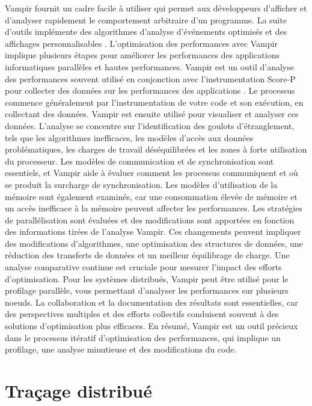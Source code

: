 Vampir fournit un cadre facile à utiliser qui permet aux développeurs d'afficher et d'analyser rapidement le comportement arbitraire d'un programme. La suite d'outils implémente des algorithmes d'analyse d'événements optimisés et des affichages personnalisables \cite{GmbH_Vampir}. L'optimisation des performances avec Vampir implique plusieurs étapes pour améliorer les performances des applications informatiques parallèles et hautes performances. Vampir est un outil d'analyse des performances souvent utilisé en conjonction avec l'instrumentation Score-P pour collecter des données sur les performances des applications \cite{Mix_2018}. Le processus commence généralement par l'instrumentation de votre code et son exécution, en collectant des données. Vampir est ensuite utilisé pour visualiser et analyser ces données. L'analyse se concentre sur l'identification des goulots d'étranglement, tels que les algorithmes inefficaces, les modèles d'accès aux données problématiques, les charges de travail déséquilibrées et les zones à forte utilisation du processeur. Les modèles de communication et de synchronisation sont essentiels, et Vampir aide à évaluer comment les processus communiquent et où se produit la surcharge de synchronisation. Les modèles d'utilisation de la mémoire sont également examinés, car une consommation élevée de mémoire et un accès inefficace à la mémoire peuvent affecter les performances. Les stratégies de parallélisation sont évaluées et des modifications sont apportées en fonction des informations tirées de l'analyse Vampir. Ces changements peuvent impliquer des modifications d'algorithmes, une optimisation des structures de données, une réduction des transferts de données et un meilleur équilibrage de charge. Une analyse comparative continue est cruciale pour mesurer l'impact des efforts d'optimisation. Pour les systèmes distribués, Vampir peut être utilisé pour le profilage parallèle, vous permettant d'analyser les performances sur plusieurs noeuds. La collaboration et la documentation des résultats sont essentielles, car des perspectives multiples et des efforts collectifs conduisent souvent à des solutions d'optimisation plus efficaces. En résumé, Vampir est un outil précieux dans le processus itératif d'optimisation des performances, qui implique un profilage, une analyse minutieuse et des modifications du code.


\section{Traçage distribué}

